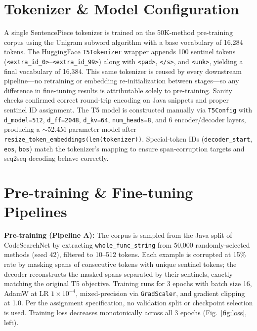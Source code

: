 \documentclass[letterpaper,12pt]{article}
\begin{document}
\vspace{-0.4cm}
\section{Tokenizer \& Model Configuration}

A single SentencePiece tokenizer is trained on the 50K-method pre-training corpus using the Unigram subword algorithm with a base vocabulary of 16{,}284 tokens. The HuggingFace \texttt{T5Tokenizer} wrapper appends 100 sentinel tokens (\texttt{<extra\_id\_0>}--\texttt{<extra\_id\_99>}) along with \texttt{<pad>}, \texttt{</s>}, and \texttt{<unk>}, yielding a final vocabulary of 16{,}384. This same tokenizer is reused by every downstream pipeline---no retraining or embedding re-initialization between stages---so any difference in fine-tuning results is attributable solely to pre-training. Sanity checks confirmed correct round-trip encoding on Java snippets and proper sentinel ID assignment. The T5 model is constructed manually via \texttt{T5Config} with \texttt{d\_model=512}, \texttt{d\_ff=2048}, \texttt{d\_kv=64}, \texttt{num\_heads=8}, and 6 encoder/decoder layers, producing a $\sim$52.4M-parameter model after \texttt{resize\_token\_embeddings(len(tokenizer))}. Special-token IDs (\texttt{decoder\_start}, \texttt{eos}, \texttt{bos}) match the tokenizer's mapping to ensure span-corruption targets and seq2seq decoding behave correctly.


\vspace{-0.4cm}
\section{Pre-training \& Fine-tuning Pipelines}

\textbf{Pre-training (Pipeline A):} The corpus is sampled from the Java split of CodeSearchNet by extracting \texttt{whole\_func\_string} from 50{,}000 randomly-selected methods (seed 42), filtered to 10--512 tokens. Each example is corrupted at 15\% rate by masking spans of consecutive tokens with unique sentinel tokens; the decoder reconstructs the masked spans separated by their sentinels, exactly matching the original T5 objective. Training runs for 3 epochs with batch size 16, AdamW at LR $1\!\times\!10^{-4}$, mixed-precision via \texttt{GradScaler}, and gradient clipping at 1.0. Per the assignment specification, no validation split or checkpoint selection is used. Training loss decreases monotonically across all 3 epochs (Fig.~\ref{fig:loss}, left).
\end{document}
